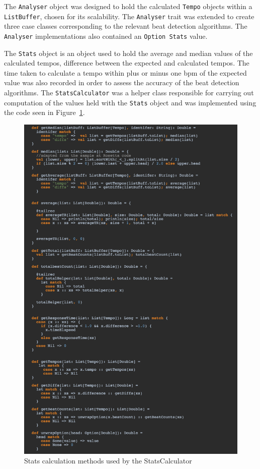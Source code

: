 \documentclass[a4paper, 11pt]{article}
\begin{document}
The \texttt{Analyser} object was designed to hold the calculated \texttt{Tempo} objects within a \texttt{ListBuffer}, chosen for its scalability. The \texttt{Analyser} trait was extended to create three case classes corresponding to the relevant beat detection algorithms. The \texttt{Analyser} implementations also contained an \texttt{Option Stats} value.\par
The \texttt{Stats} object is an object used to hold the average and median values of the calculated tempos, difference between the expected and calculated tempos. The time taken to calculate a tempo within plus or minus one bpm of the expected value was also recorded in order to assess the accuracy of the beat detection algorithms. The \texttt{StatsCalculator} was a helper class responsible for carrying out computation of the values held with the \texttt{Stats} object and was implemented using the code seen in Figure~\ref{fig: statsC}.

\begin{figure}[h]
\centering
\includegraphics[scale=0.35]{images/statscalc.jpg}
\caption{Stats calculation methods used by the StatsCalculator}
\label{fig: statsC}
\end{figure}
\clearpage
\end{document}
